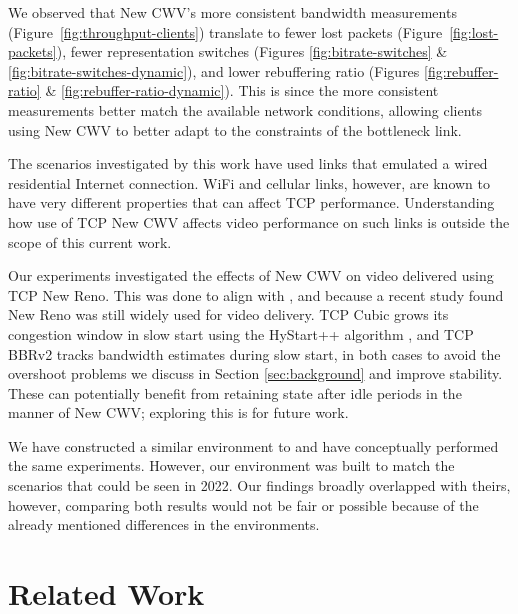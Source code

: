 \documentclass[10pt,sigconf]{acmart}
\begin{document}
We observed that New CWV's more consistent bandwidth measurements (Figure~\ref{fig:throughput-clients}) translate to fewer lost packets (Figure~\ref{fig:lost-packets}), fewer representation switches (Figures \ref{fig:bitrate-switches} \& \ref{fig:bitrate-switches-dynamic}), and lower rebuffering ratio (Figures \ref{fig:rebuffer-ratio} \& \ref{fig:rebuffer-ratio-dynamic}).
This is since the more consistent measurements better match the available network conditions, allowing clients using New CWV to better adapt to the constraints of the bottleneck link. 

The scenarios investigated by this work have used links that emulated a wired
residential Internet connection.  WiFi and cellular links, however, are known
to have very different properties that can affect TCP performance. Understanding
how use of TCP New CWV affects video performance on such links is outside the
scope of this current work.

Our experiments investigated the effects of New CWV on video delivered
using TCP New Reno. This was done to align with
\cite{Nazir-2014-performance-evaluation-congestion-window-validation-dash-newcwv},
and because a recent study \cite{Mishra-2019-the-great-internet-tcp-congestion-control-census}
found New Reno was still widely used for video delivery.
%
TCP Cubic grows its congestion window in slow start using the HyStart++
algorithm \cite{draft-ietf-tcpm-hystartplusplus}, and TCP BBRv2 tracks
bandwidth estimates during slow start, in both cases to avoid the overshoot
problems we discuss in Section \ref{sec:background} and improve stability.
These can potentially benefit from retaining state after idle periods in
the manner of New CWV; exploring this is for future work.

We have constructed a similar environment to \cite{Nazir-2014-performance-evaluation-congestion-window-validation-dash-newcwv} and have conceptually performed the same experiments. However, our environment was built to match the scenarios that could be seen in 2022. Our findings broadly overlapped with theirs, however, comparing both results would not be fair or possible because of the already mentioned differences in the environments. 

\section{Related Work}
\label{sec:related}
\end{document}
